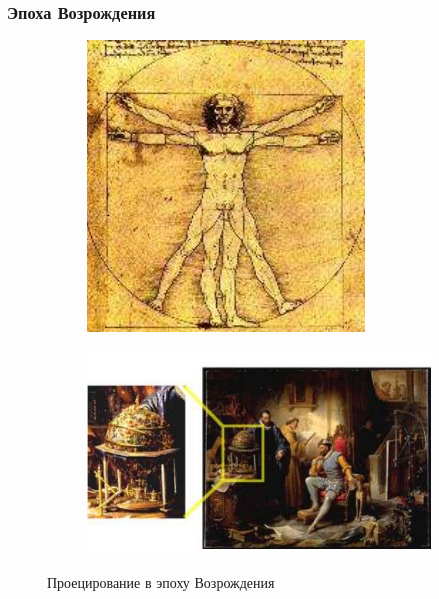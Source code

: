\documentclass[a4paper, 14pt]{extarticle}
\begin{document}
\subsubsection{Эпоха Возрождения}
\begin{figure}[h]
	\centering
	\begin{subfigure}[b]{0.45\textwidth}
		\centering
		\includegraphics[width=\textwidth]{l5/S004.jpg}
	\end{subfigure}
	\begin{subfigure}[b]{0.45\textwidth}
		\centering
		\includegraphics[width=\textwidth]{l5/S005.jpg}
	\end{subfigure}
	\caption{Проецирование в эпоху Возрождения}
\end{figure}
\end{document}
